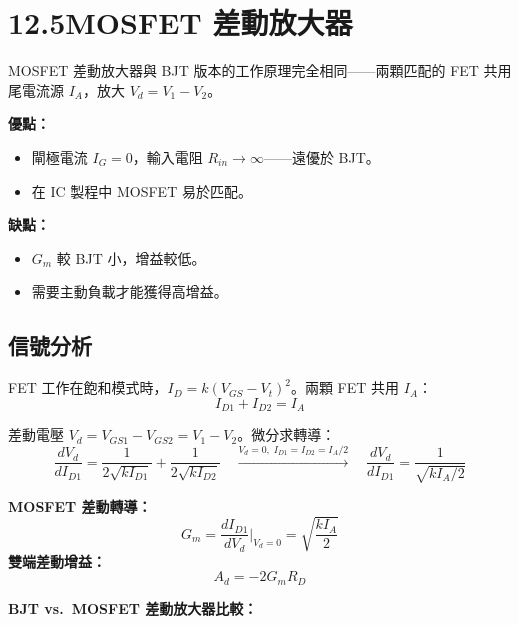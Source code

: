 \documentclass[12pt]{article}
\begin{document}
\section*{12.5\quad MOSFET 差動放大器}


\begin{keybox}
MOSFET 差動放大器與 BJT 版本的工作原理完全相同——兩顆匹配的 FET
共用尾電流源 $I_A$，放大 $V_d = V_1 - V_2$。

\medskip
\textbf{優點：}
\begin{itemize}[leftmargin=2em,itemsep=1pt]
  \item 閘極電流 $I_G = 0$，輸入電阻 $R_{in} \to \infty$——遠優於 BJT。
  \item 在 IC 製程中 MOSFET 易於匹配。
\end{itemize}

\textbf{缺點：}
\begin{itemize}[leftmargin=2em,itemsep=1pt]
  \item $G_m$ 較 BJT 小，增益較低。
  \item 需要主動負載才能獲得高增益。
\end{itemize}
\end{keybox}

\subsection*{信號分析}

FET 工作在飽和模式時，$I_D = k(V_{GS}-V_t)^2$。兩顆 FET 共用 $I_A$：
\[
  I_{D1} + I_{D2} = I_A
\]

差動電壓 $V_d = V_{GS1} - V_{GS2} = V_1 - V_2$。微分求轉導：
\[
  \frac{dV_d}{dI_{D1}} = \frac{1}{2\sqrt{kI_{D1}}} + \frac{1}{2\sqrt{kI_{D2}}}
  \quad\xrightarrow{V_d=0,\;I_{D1}=I_{D2}=I_A/2}\quad
  \frac{dV_d}{dI_{D1}} = \frac{1}{\sqrt{kI_A/2}}
\]

\begin{formulabox}
\textbf{MOSFET 差動轉導：}
\[
  G_m = \frac{dI_{D1}}{dV_d}\bigg|_{V_d=0} = \sqrt{\frac{kI_A}{2}} \tag{12.44}
\]
\textbf{雙端差動增益：}
\[
  A_d = -2G_m R_D \tag{12.47}
\]
\end{formulabox}

\noindent\textbf{BJT vs.\ MOSFET 差動放大器比較：}
\end{document}
